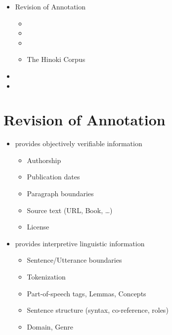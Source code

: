 \documentclass[a4paper,landscape,headrule,footrule,xetex]{foils}
\begin{document}

\maketitle



\begin{itemize} 
\item Revision of Annotation
  \begin{itemize}
  \item {}
  \item {}
  \item {}
  \item The Hinoki Corpus
  \end{itemize}
\item {}
\item {}
\end{itemize}


\section{Revision of Annotation}

  \begin{itemize}
  \item {} provides objectively verifiable information
    \begin{itemize}
    \item Authorship
    \item Publication dates
    \item Paragraph boundaries
    \item Source text (URL, Book, \ldots)
    \item License
    \end{itemize}
  \item {} provides interpretive linguistic information
    \begin{itemize}
    \item Sentence/Utterance boundaries
    \item Tokenization
    \item Part-of-speech tags, Lemmas, Concepts
    \item Sentence structure (syntax, co-reference, roles)
    \item Domain, Genre
    \end{itemize}
  \end{itemize}
\end{document}
